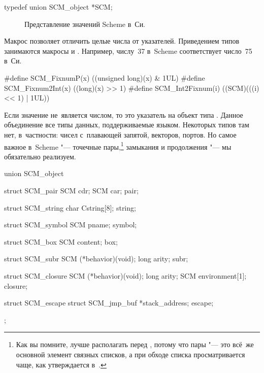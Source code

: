 \begin{code:c}
typedef union SCM_object *SCM;
\end{code:c}

\begin{figure}\centering

\caption{Представление значений Scheme в~Си.}%
\label{cc/data/pic:tagptr}
\end{figure}

Макрос  позволяет отличить целые числа от указателей.
Приведением типов занимаются макросы  и
. Например, числу~37 в~Scheme соответствует число~75 в~Си.

\begin{code:c}
#define SCM_FixnumP(x)    ((unsigned long)(x) & 1UL)
#define SCM_Fixnum2Int(x) ((long)(x) >> 1)
#define SCM_Int2Fixnum(i) ((SCM)(((i) << 1) | 1UL))
\end{code:c}

Если значение  не~является числом, то это указатель на объект типа
. Данное объединение все типы данных, поддерживаемые языком.
Некоторых типов там нет, в~частности: чисел с~плавающей запятой, векторов,
портов. Но самое важное в~Scheme "--- точечные пары,\footnote*{Как вы помните,
 лучше располагать перед , потому что пары "--- это всё~же
основной элемент связных списков, а  при обходе списка просматривается
чаще, как утверждается в~\cite{cla79}.} замыкания и продолжения "--- мы
обязательно реализуем.

\begin{code:c}
union SCM_object {
    struct SCM_pair {
        SCM cdr;
        SCM car;
    } pair;

    struct SCM_string {
        char Cstring[8];
    } string;

    struct SCM_symbol {
        SCM pname;
    } symbol;

    struct SCM_box {
        SCM content;
    } box;

    struct SCM_subr {
        SCM (*behavior)(void);
        long arity;
    } subr;

    struct SCM_closure {
        SCM (*behavior)(void);
        long arity;
        SCM environment[1];
    } closure;

    struct SCM_escape {
        struct SCM_jmp_buf *stack_address;
    } escape;
};
\end{code:c}

